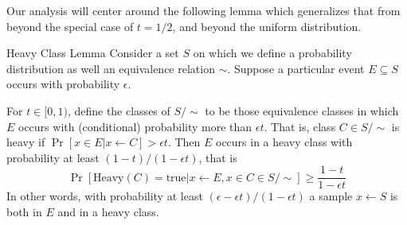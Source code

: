 Our analysis will center around the following lemma which generalizes that from \cite{Dam10} beyond the special case of $t=1/2$, and beyond the uniform distribution.

\begin{lemma}{Heavy Class Lemma}
    Consider a set $S$ on which we define a probability distribution as well an equivalence relation $\sim$.
    Suppose a particular event $E\subseteq S$ occurs with probability $\epsilon$.

    For $t\in[0,1)$, define the  classes of $S/\sim$ to be those equivalence classes in which $E$ occurs with (conditional) probability more than $\epsilon t$.
    That is, class $C\in S/\sim$ is heavy if $\Pr[x\in E|x\leftarrow C]>\epsilon t$.
    Then $E$ occurs in a heavy class with probability at least $(1-t)/(1-\epsilon t)$, that is
    \begin{equation}
        \Pr[\text{Heavy}(C)=\text{true}|x\leftarrow E, x\in C\in S/\sim]
        \geq \frac{1-t}{1-\epsilon t}
    \end{equation}
    In other words, with probability at least $(\epsilon-\epsilon t)/(1-\epsilon t)$ a sample $x\leftarrow S$ is both in $E$ and in a heavy class.


\end{lemma}
